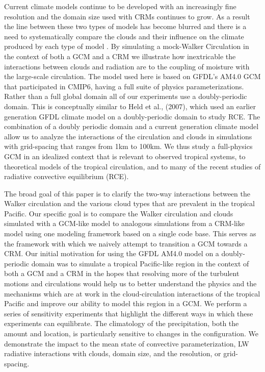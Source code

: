 \documentclass[draft]{agujournal2019}
\begin{document}
Current climate models continue to be developed with an increasingly fine resolution and 
the domain size used with CRMs continues to grow.  As a result the line between these two types 
of models has become blurred and there is a need to systematically compare the clouds and their 
influence on the climate produced by each type of model \cite{Schneider_etal_2017}.
By simulating a mock-Walker Circulation in the context of both a GCM and a CRM we 
illustrate how inextricable the interactions between clouds and radiation are to the coupling 
of moisture with the large-scale circulation.     
The model used here is based on GFDL's AM4.0 GCM that participated in CMIP6, having a full suite of physics parameterizations.  
Rather than a full global domain all of our experiments use a doubly-periodic domain.    
This is conceptually similar to Held et al., (2007), which used an earlier generation GFDL climate model on a doubly-periodic domain to study RCE.   
The combination of a doubly periodic domain and a current generation climate model allow us to analyze the interactions of the 
circulation and clouds in simulations with grid-spacing that ranges from 1km to 100km.  
We thus study a full-physics GCM in an idealized context that is relevant to observed tropical systems, to theoretical
models of the tropical circulation, and to many of the recent studies of radiative convective equilibrium (RCE).   


The broad goal of this paper is to clarify the two-way interactions between the Walker circulation and 
the various cloud types that are prevalent in the tropical Pacific.   Our specific goal is
to compare the Walker circulation and clouds simulated with a GCM-like model to analogous 
simulations from a CRM-like model using one modeling framework based on a single code base. 
This serves as the framework with which we naively attempt to transition a GCM 
towards a CRM.  Our initial motivation for using the 
GFDL AM4.0 model on a doubly-periodic domain was to simulate a tropical Pacific-like region 
in the context of both a GCM and a CRM in the hopes that resolving more of the turbulent motions and circulations
would help us to better understand the physics and the mechanisms which are at work in the cloud-circulation
interactions of the tropical Pacific and improve our ability to model this region in a GCM.    
We perform a series of sensitivity experiments that highlight the different ways in which these experiments can equilibrate.  
The climatology of the precipitation, both the amount and location, is particularly sensitive to changes in the configuration.   
We demonstrate the impact to the mean state of convective parameterization, LW radiative interactions with clouds, domain size, 
and the resolution, or grid-spacing.
\end{document}
